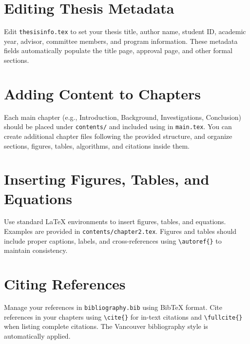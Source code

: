 \section{Editing Thesis Metadata}
\begin{paragraph}
Edit \texttt{thesisinfo.tex} to set your thesis title, author name, student ID, academic year, advisor, committee members, and program information. These metadata fields automatically populate the title page, approval page, and other formal sections.
\end{paragraph}

\section{Adding Content to Chapters}
\begin{paragraph}
Each main chapter (e.g., Introduction, Background, Investigations, Conclusion) should be placed under \texttt{contents/} and included using \verb|| in \texttt{main.tex}. You can create additional chapter files following the provided structure, and organize sections, figures, tables, algorithms, and citations inside them.
\end{paragraph}

\section{Inserting Figures, Tables, and Equations}
\begin{paragraph}
Use standard LaTeX environments to insert figures, tables, and equations. Examples are provided in \texttt{contents/chapter2.tex}. Figures and tables should include proper captions, labels, and cross-references using \verb|\autoref{}| to maintain consistency.
\end{paragraph}

\section{Citing References}
\begin{paragraph}
Manage your references in \texttt{bibliography.bib} using BibTeX format. Cite references in your chapters using \verb|\cite{}| for in-text citations and \verb|\fullcite{}| when listing complete citations. The Vancouver bibliography style is automatically applied.
\end{paragraph}

